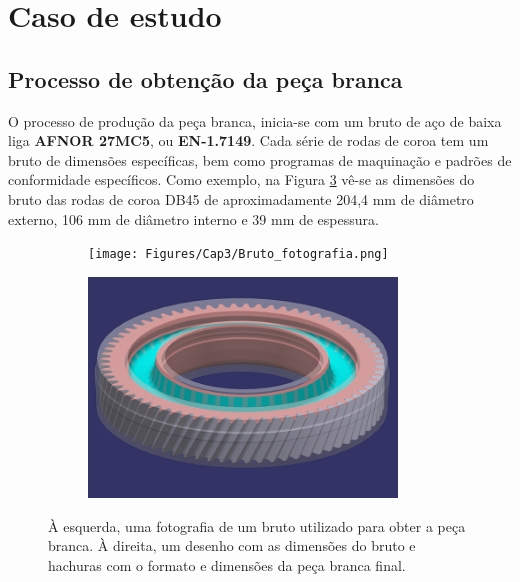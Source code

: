 \section{Caso de estudo} \label{sec:materiais_CS}
\subsection{Processo de obtenção da peça branca} \label{ssec:materiais_CS_peca_branca}

O processo de produção da peça branca, inicia-se com um bruto de aço de baixa liga \textbf{AFNOR 27MC5}, ou \textbf{EN-1.7149}. Cada série de rodas de coroa tem um bruto de dimensões específicas, bem como programas de maquinação e padrões de conformidade específicos. Como exemplo, na Figura \ref{fig:Bruto_desenho} vê-se as dimensões do bruto das rodas de coroa DB45 de aproximadamente 204,4 mm de diâmetro externo, 106 mm de diâmetro interno e 39 mm de espessura.

\begin{figure}[htb]
    \centering
    \begin{subfigure}{.5\textwidth}
        \centering
        \texttt{[image: Figures/Cap3/Bruto\_fotografia.png]}
        \caption{}
        \label{fig:Bruto_fotografia}
    \end{subfigure}%
    \begin{subfigure}{.5\textwidth}
        \centering
        \includegraphics[width = 0.9\textwidth]{Figures/Cap3/Bruto_CAD.png}
        \caption{}
        \label{fig:Bruto_desenho}
    \end{subfigure}
    \caption[Imagens do bruto para fabricação da peça branca]%
    {À esquerda, uma fotografia de um bruto utilizado para obter a peça branca. À direita, um desenho com as dimensões do bruto e hachuras com o formato e dimensões da peça branca final.}
\end{figure}

